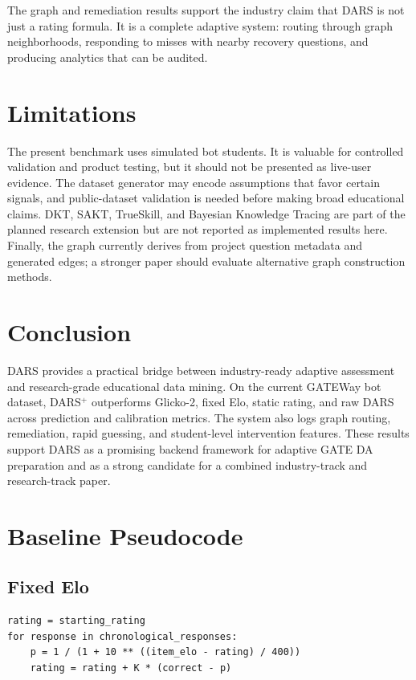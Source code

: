 \documentclass[sigconf,nonacm]{acmart}
\begin{document}
The graph and remediation results support the industry claim that DARS is not just a rating formula. It is a complete adaptive system: routing through graph neighborhoods, responding to misses with nearby recovery questions, and producing analytics that can be audited.

\section{Limitations}
The present benchmark uses simulated bot students. It is valuable for controlled validation and product testing, but it should not be presented as live-user evidence. The dataset generator may encode assumptions that favor certain signals, and public-dataset validation is needed before making broad educational claims. DKT, SAKT, TrueSkill, and Bayesian Knowledge Tracing are part of the planned research extension but are not reported as implemented results here. Finally, the graph currently derives from project question metadata and generated edges; a stronger paper should evaluate alternative graph construction methods.

\section{Conclusion}
DARS provides a practical bridge between industry-ready adaptive assessment and research-grade educational data mining. On the current GATEWay bot dataset, DARS$^+$ outperforms Glicko-2, fixed Elo, static rating, and raw DARS across prediction and calibration metrics. The system also logs graph routing, remediation, rapid guessing, and student-level intervention features. These results support DARS as a promising backend framework for adaptive GATE DA preparation and as a strong candidate for a combined industry-track and research-track paper.

\appendix
\section{Baseline Pseudocode}
\subsection{Fixed Elo}
\begin{verbatim}
rating = starting_rating
for response in chronological_responses:
    p = 1 / (1 + 10 ** ((item_elo - rating) / 400))
    rating = rating + K * (correct - p)
\end{verbatim}
\end{document}
